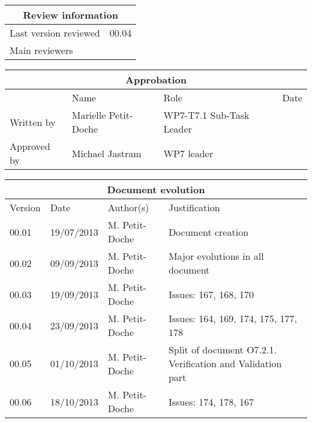 \documentclass{template/openetcs_report}
\begin{document}
\begin{tabular}{|p{4.4cm}|p{8.7cm}|}
\hline
\multicolumn{2}{|c|}{Review information} \\
\hline
Last version reviewed & 00.04 \\
\hline
Main reviewers &  \\
 
\hline
\end{tabular}

\begin{tabular}{|p{2.2cm}|p{4cm}|p{4cm}|p{2cm}|}
\hline
\multicolumn{4}{|c|}{Approbation} \\
\hline
  &  Name & Role & Date   \\
\hline  
Written by    &  Marielle Petit-Doche & WP7-T7.1 Sub-Task Leader  & \\
\hline
Approved by & Michael Jastram & WP7 leader & \\
\hline
\end{tabular}

\begin{tabular}{|p{2.2cm}|p{2cm}|p{3cm}|p{5cm}|}
\hline
\multicolumn{4}{|c|}{Document evolution} \\
\hline
Version &  Date & Author(s) & Justification  \\
\hline  
00.01 & 19/07/2013 & M. Petit-Doche &  Document creation  \\
00.02 & 09/09/2013 & M. Petit-Doche &  Major evolutions in all document  \\
00.03 & 19/09/2013 & M. Petit-Doche &  Issues: 167, 168, 170  \\
00.04 & 23/09/2013 & M. Petit-Doche &  Issues: 164, 169, 174, 175, 177, 178  \\
00.05 & 01/10/2013 & M. Petit-Doche &  Split of document O7.2.1. Verification and Validation part \\
00.06 & 18/10/2013 & M. Petit-Doche &  Issues: 174, 178, 167\\
\hline  
\end{tabular}



\newcommand{\tbd}{\colorbox{cyan}{\%\%To Be Defined\%\%}}
\newcommand{\tbc}{\colorbox{cyan}{\%\%To Be Confirmed\%\%}}
\newcommand{\todo}[1]{\colorbox{cyan}{\%\%{#1}\%\%}}
\newlength{\origindent}
\end{document}
